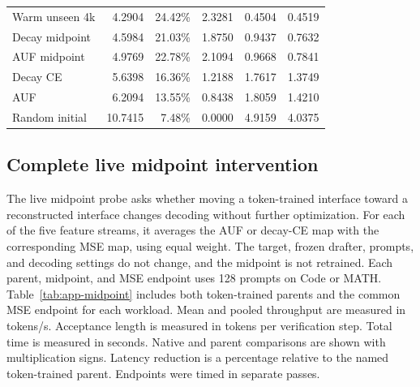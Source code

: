 \begin{table}[htbp]
\begin{tabular}{lrrrrr}
Warm unseen 4k & 4.2904 & 24.42\% & 2.3281 & 0.4504 & 0.4519 \\
Decay midpoint & 4.5984 & 21.03\% & 1.8750 & 0.9437 & 0.7632 \\
AUF midpoint & 4.9769 & 22.78\% & 2.1094 & 0.9668 & 0.7841 \\
Decay CE & 5.6398 & 16.36\% & 1.2188 & 1.7617 & 1.3749 \\
AUF & 6.2094 & 13.55\% & 0.8438 & 1.8059 & 1.4210 \\
Random initial & 10.7415 & 7.48\% & 0.0000 & 4.9159 & 4.0375 \\
\bottomrule
\end{tabular}
\end{table}

\FloatBarrier
\subsection{Complete live midpoint intervention}
\label{app:midpoint-full}

The live midpoint probe asks whether moving a token-trained interface toward a reconstructed interface changes decoding without further optimization. For each of the five feature streams, it averages the AUF or decay-CE map with the corresponding MSE map, using equal weight. The target, frozen drafter, prompts, and decoding settings do not change, and the midpoint is not retrained. Each parent, midpoint, and MSE endpoint uses 128 prompts on Code or MATH. Table~\ref{tab:app-midpoint} includes both token-trained parents and the common MSE endpoint for each workload. Mean and pooled throughput are measured in tokens/s. Acceptance length is measured in tokens per verification step. Total time is measured in seconds. Native and parent comparisons are shown with multiplication signs. Latency reduction is a percentage relative to the named token-trained parent. Endpoints were timed in separate passes.

